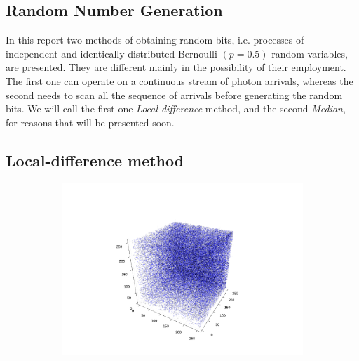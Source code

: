 \documentclass[10pt, final]{article}
\begin{document}
\begin{multicols}{2}
\section{Random Number Generation}
In this report two methods of obtaining random bits, i.e. 
 processes of independent and identically distributed Bernoulli $(p = 0.5)$ random variables, are presented. They are different mainly in the possibility of their employment. The first one can operate on a continuous stream of photon arrivals, whereas the second needs to scan all the sequence of arrivals before generating the random bits. We will call the first one \emph{Local-difference} method, and the second \emph{Median}, for reasons that will be presented soon.
\subsection*{Local-difference method}
\begin{mdframed}
    \begin{figure}[H]
        \begin{subfigure}{\textwidth}
            \centering
            \includegraphics[width = \textwidth]{../random_img/d2scatter3d.pdf}
            \caption{}
        \end{subfigure}


\end{figure}
\end{mdframed}
\end{multicols}
\end{document}
